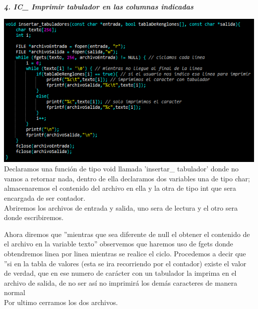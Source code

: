 \documentclass[12pt,letterpaper]{report}
\begin{document}
\textbf{\textit{ 4. IC\_  Imprimir tabulador en las columnas indicadas}}\\
\begin{multicols}{2}

\includegraphics[scale=0.5]{punto4}\\
Declaramos una función de tipo void llamada 'insertar\_ tabulador' donde no vamos a retornar nada, dentro de ella declaramos dos variables una de tipo char; almacenaremos el contenido del archivo en ella y la otra de tipo int que sera encargada de ser contador.\\
Abriremos los archivos de entrada y salida, uno sera de lectura y el otro sera donde escribiremos.\\
\end{multicols}
Ahora diremos que ''mientras que sea diferente de null el obtener el contenido de el archivo en la variable texto'' observemos que haremos uso de fgets donde obtendremos linea por linea mientras se realice el ciclo. Procedemos a decir que ''si en la tabla de valores (esta se ira recorriendo por el contador) existe el valor de verdad, que en ese numero de carácter con un tabulador la imprima en el archivo de salida, de no ser así no imprimirá los demás caracteres de manera normal\\ 
Por ultimo cerramos los dos archivos.
\end{document}
